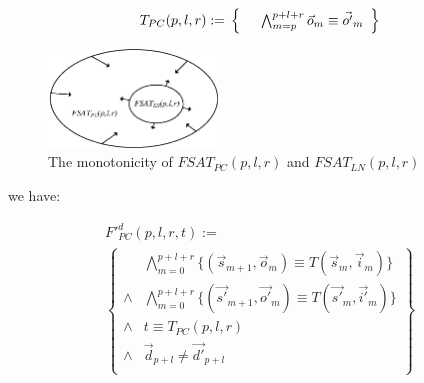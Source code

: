\documentclass[conference]{IEEEtran}
\begin{document}

\begin{equation}\label{tpc}
T_{PC}(p,l,r):=\\
\left\{
\begin{array}{cc}
      &\bigwedge_{m=p}^{p+l+r}\vec{o}_m\equiv \vec{o'}_m \\
\end{array}
\right\}
\end{equation}

\begin{figure}[b]
\begin{center}
\includegraphics[width=0.4\textwidth]{mono}
\end{center}
\caption{The monotonicity of $FSAT_{PC}(p,l,r)$ and $FSAT_{LN}(p,l,r)$}
  \label{fig_mono}
\end{figure}

we have:

\begin{multline}\label{fpcq}
F'^d_{PC}(p,l,r,t):=\\
\left\{
\begin{array}{cc}
&\bigwedge_{m=0}^{p+l+r}
\{
(\vec{s}_{m+1},\vec{o}_m)\equiv T(\vec{s}_m,\vec{i}_m)
\}
\\
\wedge&\bigwedge_{m=0}^{p+l+r}
\{
(\vec{s'}_{m+1},\vec{o'}_m)\equiv T(\vec{s'}_m,\vec{i'}_m)
\}
\\
\wedge& t\equiv T_{PC}(p,l,r)\\
\wedge& \vec{d}_{p+l}\ne \vec{d'}_{p+l} \\
\end{array}
\right\}
\end{multline}
\end{document}
